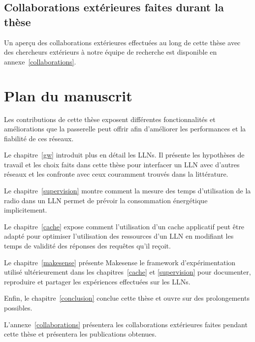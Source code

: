 \subsection{Collaborations extérieures faites durant la thèse}

Un aperçu des collaborations extérieures effectuées au long de cette thèse avec des chercheurs extérieurs à notre équipe de recherche est disponible en annexe~\ref{collaborations}.

\section{Plan du manuscrit}
\label{intro:thesis_outline}

Les contributions de cette thèse exposent différentes fonctionnalités et améliorations que la passerelle peut offrir afin d'améliorer les performances et la fiabilité de ces réseaux.

Le chapitre~\ref{gw} introduit plus en détail les \ac{LLN}s.
Il présente les hypothèses de travail et les choix faits dans cette thèse pour interfacer un \ac{LLN} avec d'autres réseaux et les confronte avec ceux couramment trouvés dans la littérature.

Le chapitre~\ref{supervision} montre comment la mesure des temps d'utilisation de la radio dans un \ac{LLN} permet de prévoir la consommation énergétique implicitement.

Le chapitre~\ref{cache} expose comment l'utilisation d'un cache applicatif peut être adapté pour optimiser l'utilisation des ressources d'un \ac{LLN} en modifiant les temps de validité des réponses des requêtes qu'il reçoit.

Le chapitre~\ref{makesense} présente Makesense le framework d'expérimentation utilisé ultérieurement dans les chapitres~\ref{cache} et \ref{supervision} pour documenter, reproduire et partager les expériences effectuées sur les \ac{LLN}s.

Enfin, le chapitre~\ref{conclusion} conclue cette thèse et ouvre sur des prolongements possibles.

L'annexe~\ref{collaborations} présentera les collaborations extérieures faites pendant cette thèse et présentera les publications obtenues.
